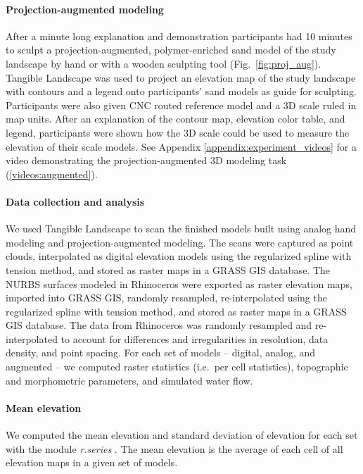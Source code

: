 \documentclass[prodmode,acmtochi]{acmsmall} %
\begin{document}
\paragraph{Projection-augmented modeling}
After a minute long explanation and demonstration
participants had 10 minutes to sculpt
a projection-augmented, polymer-enriched sand model
of the study landscape by hand or with a wooden sculpting tool 
(Fig.~\ref{fig:proj_aug}). 
Tangible Landscape was used to project 
an elevation map of the study landscape
with contours and a legend
onto participants' sand models as guide for sculpting. 
Participants were also given CNC routed reference model and 
a 3D scale ruled in map units. 
After an explanation of the contour map, elevation color table, and legend,
participants were shown how the 3D scale could be used to 
measure the elevation of their scale models.
%
See Appendix \ref{appendix:experiment_videos}
for a video demonstrating the projection-augmented 3D modeling task (\ref{videos:augmented}).

\paragraph{Data collection and analysis}
We used Tangible Landscape to scan the finished models 
built using analog hand modeling and projection-augmented modeling.
The scans were captured as point clouds, interpolated 
as digital elevation models 
using the regularized spline with tension method,
and stored as raster maps in a GRASS GIS database. 
The NURBS surfaces modeled in Rhinoceros 
were exported as raster elevation maps,
imported into GRASS GIS, randomly resampled, 
re-interpolated using the regularized spline with tension method, 
and stored as raster maps in a GRASS GIS database. 
The data from Rhinoceros 
was randomly resampled and re-interpolated to account for 
differences and irregularities in resolution, data density, and point spacing.
%
For each set of models -- digital, analog, and augmented --
we computed raster statistics (i.e.~per cell statistics), 
topographic and morphometric parameters, 
and simulated water flow.

\paragraph{Mean elevation}
We computed 
the mean elevation 
and standard deviation of elevation
for each set
with the module \textit{r.series} \cite{r.series}.
The mean elevation is the average of each cell 
of all elevation maps in a given set of models.
\end{document}
